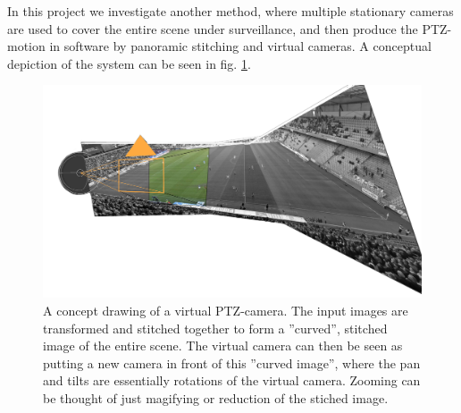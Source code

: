 In this project we investigate another method, where multiple stationary cameras are used to cover the entire scene under surveillance, and then produce the PTZ-motion in software by panoramic stitching and virtual cameras.
A conceptual depiction of the system can be seen in fig. \ref{fig:comp}.

\begin{figure}[H]
	\centering
	\includegraphics[width=0.7\columnwidth]{../results/images/PTZ_comp.png}
	\caption{A concept drawing of a virtual PTZ-camera. The input images are transformed and stitched together to form a ''curved'', stitched image of the entire scene. The virtual camera can then be seen as putting a new camera in front of this ''curved image'', where the pan and tilts are essentially rotations of the virtual camera. Zooming can be thought of just magifying or reduction of the stiched image.}
	\label{fig:comp}
\end{figure}
